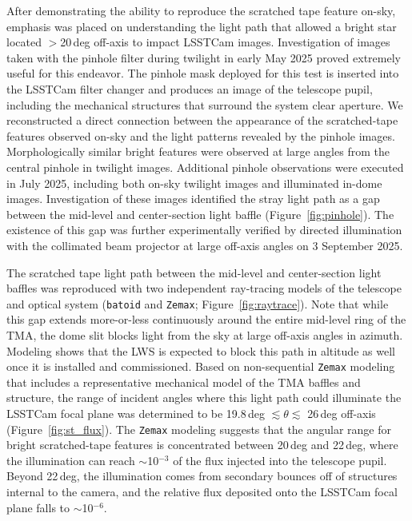 \documentclass[SE,authoryear,toc]{lsstdoc}
\begin{document}
After demonstrating the ability to reproduce the scratched tape feature on-sky, emphasis was placed on understanding the light path that allowed a bright star located $>$20\,deg off-axis to impact LSSTCam images. Investigation of images taken with the pinhole filter during twilight in early May 2025 proved extremely useful for this endeavor. The pinhole mask deployed for this test is inserted into the LSSTCam filter changer and produces an image of the telescope pupil, including the mechanical structures that surround the system clear aperture. We reconstructed a direct connection between the appearance of the scratched-tape features observed on-sky and the light patterns revealed by the pinhole images. Morphologically similar bright features were observed at large angles from the central pinhole in twilight images. Additional pinhole observations were executed in July 2025, including both on-sky twilight images and illuminated in-dome images. Investigation of these images identified the stray light path as a gap between the mid-level and center-section light baffle (Figure~\ref{fig:pinhole}). The existence of this gap was further experimentally verified by directed illumination with the collimated beam projector at large off-axis angles on 3 September 2025.


The scratched tape light path between the mid-level and center-section light baffles was reproduced with two independent ray-tracing models of the telescope and optical system (\texttt{batoid} and \texttt{Zemax}; Figure~\ref{fig:raytrace}). Note that while this gap extends more-or-less continuously around the entire mid-level ring of the TMA, the dome slit blocks light from the sky at large off-axis angles in azimuth. Modeling shows that the LWS is expected to block this path in altitude as well once it is installed and commissioned. Based on non-sequential \texttt{Zemax} modeling that includes a representative mechanical model of the TMA baffles and structure, the range of incident angles where this light path could illuminate the LSSTCam focal plane was determined to be 19.8\,deg $ \lesssim \theta \lesssim$ 26\,deg off-axis (Figure~\ref{fig:st_flux}). The \texttt{Zemax} modeling suggests that the angular range for bright scratched-tape features is concentrated between 20\,deg and 22\,deg, where the illumination can reach $\sim$10$^{-3}$ of the flux injected into the telescope pupil. Beyond 22\,deg, the illumination comes from secondary bounces off of structures internal to the camera, and the relative flux deposited onto the LSSTCam focal plane falls to $\sim$10$^{-6}$.
\end{document}
